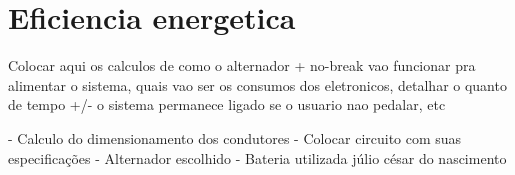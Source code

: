 \section{Eficiencia energetica}
Colocar aqui os calculos de como o alternador + no-break vao funcionar pra alimentar o sistema, quais vao ser os consumos dos eletronicos, detalhar o quanto de tempo +/- o sistema permanece ligado se o usuario nao pedalar, etc

- Calculo do dimensionamento dos condutores
- Colocar circuito com suas especificações
- Alternador escolhido
- Bateria utilizada
júlio césar do nascimento 
